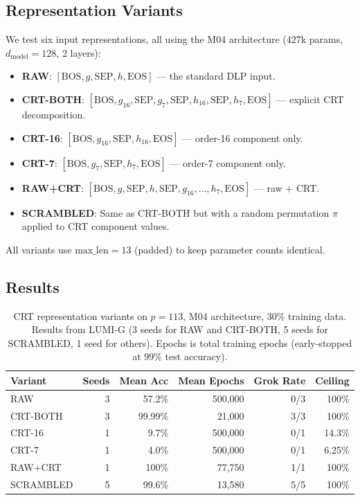 \documentclass[11pt]{article}
\begin{document}
\subsection{Representation Variants}

We test six input representations, all using the M04 architecture (427k params, $d_{\mathrm{model}}=128$, 2 layers):

\begin{itemize}[leftmargin=*]
    \item \textbf{RAW}: $[\text{BOS}, g, \text{SEP}, h, \text{EOS}]$ --- the standard DLP input.
    \item \textbf{CRT-BOTH}: $[\text{BOS}, g_{16}, \text{SEP}, g_7, \text{SEP}, h_{16}, \text{SEP}, h_7, \text{EOS}]$ --- explicit CRT decomposition.
    \item \textbf{CRT-16}: $[\text{BOS}, g_{16}, \text{SEP}, h_{16}, \text{EOS}]$ --- order-16 component only.
    \item \textbf{CRT-7}: $[\text{BOS}, g_7, \text{SEP}, h_7, \text{EOS}]$ --- order-7 component only.
    \item \textbf{RAW+CRT}: $[\text{BOS}, g, \text{SEP}, h, \text{SEP}, g_{16}, \ldots, h_7, \text{EOS}]$ --- raw + CRT.
    \item \textbf{SCRAMBLED}: Same as CRT-BOTH but with a random permutation $\pi$ applied to CRT component values.
\end{itemize}

All variants use $\text{max\_len}=13$ (padded) to keep parameter counts identical.

\subsection{Results}

\begin{table}[t]
\centering
\caption{CRT representation variants on $p = 113$, M04 architecture, 30\% training data. Results from LUMI-G (3 seeds for RAW and CRT-BOTH, 5 seeds for SCRAMBLED, 1 seed for others). Epochs is total training epochs (early-stopped at 99\% test accuracy).}
\label{tab:crt_results}
\begin{tabular}{lrrrrr}
\toprule
Variant & Seeds & Mean Acc & Mean Epochs & Grok Rate & Ceiling \\
\midrule
RAW & 3 & 57.2\% & 500,000 & 0/3 & 100\% \\
CRT-BOTH & 3 & 99.99\% & 21,000 & 3/3 & 100\% \\
CRT-16 & 1 & 9.7\% & 500,000 & 0/1 & 14.3\% \\
CRT-7 & 1 & 4.0\% & 500,000 & 0/1 & 6.25\% \\
RAW+CRT & 1 & 100\% & 77,750 & 1/1 & 100\% \\
SCRAMBLED & 5 & 99.6\% & 13,580 & 5/5 & 100\% \\
\bottomrule
\end{tabular}
\end{table}
\end{document}
